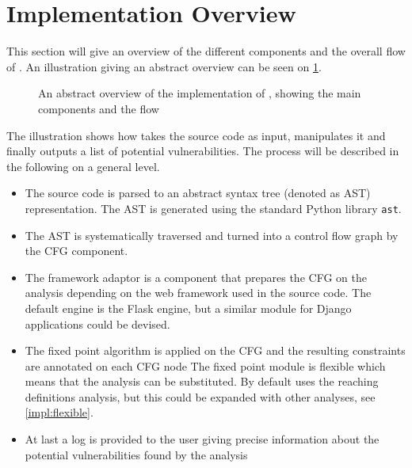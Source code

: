 \section{Implementation Overview}\label{impl:overview}
This section will give an overview of the different components and the overall flow of \pyt{}.
An illustration giving an abstract overview can be seen on \cref{figure:implementation_overview}.

\begin{figure}
  
  \caption{An abstract overview of the implementation of \pyt{}, showing the main components and the flow}
  \label{figure:implementation_overview}
\end{figure}

The illustration shows how  \pyt{} takes the source code as input, manipulates it and finally outputs a list of potential vulnerabilities.
The process will be described in the following on a general level.

\begin{itemize}
\item The source code is parsed to an abstract syntax tree (denoted as AST) representation.
  The AST is generated using the standard Python library \texttt{ast}\cite{python_ast}. 
\item The AST is systematically traversed and turned into a control flow graph by the CFG component.
\item The framework adaptor is a component that prepares the CFG on the analysis depending on the web framework used in the source code.
  The default engine is the Flask engine, but a similar module for Django applications could be devised.
\item The fixed point algorithm is applied on the CFG and the resulting constraints are annotated on each CFG node
  The fixed point module is flexible which means that the analysis can be substituted.
  By default \pyt{} uses the reaching definitions analysis, but this could be expanded with other analyses, see \cref{impl:flexible}.
\item At last a log is provided to the user giving precise information about the potential vulnerabilities found by the analysis
\end{itemize}

